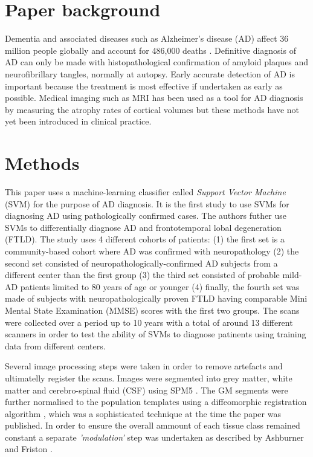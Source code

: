 \documentclass[11pt,a4paper,oneside]{report}
\begin{document}
\section*{Paper background}

Dementia and associated diseases such as Alzheimer's disease (AD) affect 36 million people globally \cite{world2012dementia} and account for 486,000 deaths \cite{lozano2013global}. Definitive diagnosis of AD can only be made with histopathological confirmation of amyloid plaques and neurofibrillary tangles, normally at autopsy. Early accurate detection of AD is important because the treatment is most effective if undertaken as early as possible. Medical imaging such as MRI has been used as a tool for AD diagnosis by measuring the atrophy rates of cortical volumes \cite{fox2004imaging,barnes2004differentiating} but these methods have not yet been introduced in clinical practice.

\section*{Methods}


This paper uses a machine-learning classifier called \emph{Support Vector Machine} (SVM) for the purpose of AD diagnosis. It is the first study to use SVMs for diagnosing AD using pathologically confirmed cases. The authors futher use SVMs to differentially diagnose AD and frontotemporal lobal degeneration (FTLD). The study uses 4 different cohorts of patients: (1) the first set is a community-based cohort where AD was confirmed with neuropathology (2) the second set consisted of neuropathologically-confirmed AD subjects from a different center than the first group (3) the third set consisted of probable mild-AD patients limited to 80 years of age or younger (4) finally, the fourth set was made of subjects with neuropathologically proven FTLD having comparable Mini Mental State Examination (MMSE) scores with the first two groups. The scans were collected over a period up to 10 years with a total of around 13 different scanners in order to test the ability of SVMs to diagnose patinents using training data from different centers.


Several image processing steps were taken in order to remove artefacts and ultimatelly register the scans. Images were segmented into grey matter, white matter and cerebro-spinal fluid (CSF) using SPM5 \cite{SPM5}. The GM segments were further normalised to the population templates using a diffeomorphic registration algorithm \cite{ashburner2007fast}, which was a sophisticated technique at the time the paper was published. In order to ensure the overall ammount of each tissue class remained constant a separate \emph{'modulation'} step was undertaken as described by Ashburner and Friston \cite{ashburner2000voxel}.
\end{document}
